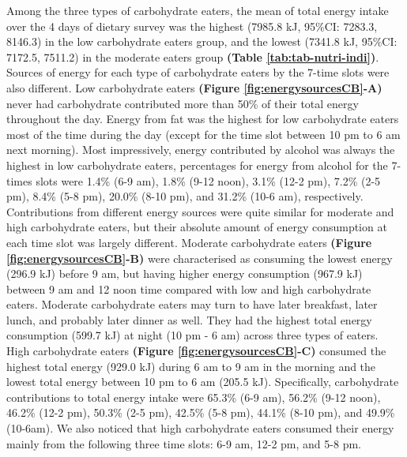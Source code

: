 Among the three types of carbohydrate eaters, the mean of total energy intake over the 4 days of dietary survey was the highest (7985.8 kJ, 95\%CI: 7283.3, 8146.3) in the low carbohydrate eaters group, and the lowest (7341.8 kJ, 95\%CI: 7172.5, 7511.2) in the moderate eaters group \textbf{(Table \ref{tab:tab-nutri-indi})}. Sources of energy for each type of carbohydrate eaters by the 7-time slots were also different. Low carbohydrate eaters \textbf{(Figure \ref{fig:energysourcesCB}-A)} never had carbohydrate contributed more than 50\% of their total energy throughout the day. Energy from fat was the highest for low carbohydrate eaters most of the time during the day (except for the time slot between 10 pm to 6 am next morning). Most impressively, energy contributed by alcohol was always the highest in low carbohydrate eaters, percentages for energy from alcohol for the 7-times slots were 1.4\% (6-9 am), 1.8\% (9-12 noon), 3.1\% (12-2 pm), 7.2\% (2-5 pm), 8.4\% (5-8 pm), 20.0\% (8-10 pm), and 31.2\% (10-6 am), respectively. Contributions from different energy sources were quite similar for moderate and high carbohydrate eaters, but their absolute amount of energy consumption at each time slot was largely different. Moderate carbohydrate eaters \textbf{(Figure \ref{fig:energysourcesCB}-B)} were characterised as consuming the lowest energy (296.9 kJ) before 9 am, but having higher energy consumption (967.9 kJ) between 9 am and 12 noon time compared with low and high carbohydrate eaters. Moderate carbohydrate eaters may turn to have later breakfast, later lunch, and probably later dinner as well. They had the highest total energy consumption (599.7 kJ) at night (10 pm - 6 am) across three types of eaters. High carbohydrate eaters \textbf{(Figure \ref{fig:energysourcesCB}-C)} consumed the highest total energy (929.0 kJ) during 6 am to 9 am in the morning and the lowest total energy between 10 pm to 6 am (205.5 kJ). Specifically, carbohydrate contributions to total energy intake were 65.3\% (6-9 am), 56.2\% (9-12 noon), 46.2\% (12-2 pm), 50.3\% (2-5 pm), 42.5\% (5-8 pm), 44.1\% (8-10 pm), and 49.9\% (10-6am). We also noticed that high carbohydrate eaters consumed their energy mainly from the following three time slots: 6-9 am, 12-2 pm, and 5-8 pm. 

